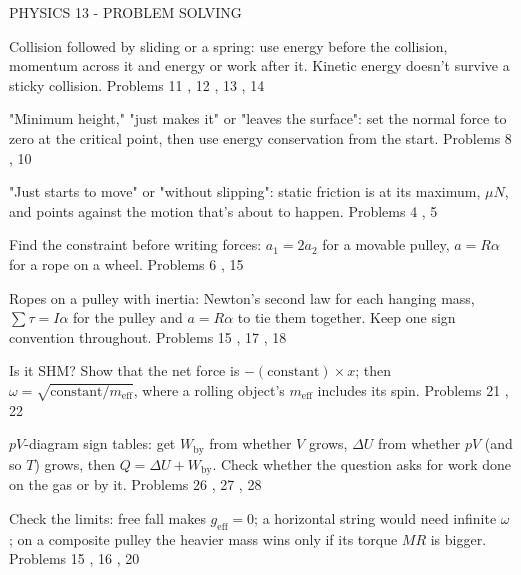 PHYSICS 13 - PROBLEM SOLVING

Collision followed by sliding or a spring: use energy before the collision, momentum across it and energy or work after it. Kinetic energy doesn't survive a sticky collision. Problems 11 , 12 , 13 , 14

"Minimum height," "just makes it" or "leaves the surface": set the normal force to zero at the critical point, then use energy conservation from the start. Problems 8 , 10

"Just starts to move" or "without slipping": static friction is at its maximum, \(\mu N\), and points against the motion that's about to happen. Problems 4 , 5

Find the constraint before writing forces: \(a_1 = 2a_2\) for a movable pulley, \(a = R\alpha\) for a rope on a wheel. Problems 6 , 15

Ropes on a pulley with inertia: Newton's second law for each hanging mass, \(\sum\tau = I\alpha\) for the pulley and \(a = R\alpha\) to tie them together. Keep one sign convention throughout. Problems 15 , 17 , 18

Is it SHM? Show that the net force is \(-(\text{constant})\times x\); then \(\omega = \sqrt{\text{constant}/m_{\text{eff}}}\), where a rolling object's \(m_{\text{eff}}\) includes its spin. Problems 21 , 22

\(pV\)-diagram sign tables: get \(W_{\text{by}}\) from whether \(V\) grows, \(\Delta U\) from whether \(pV\) (and so \(T\)) grows, then \(Q = \Delta U + W_{\text{by}}\). Check whether the question asks for work done on the gas or by it. Problems 26 , 27 , 28

Check the limits: free fall makes \(g_{\text{eff}} = 0\); a horizontal string would need infinite \(\omega\); on a composite pulley the heavier mass wins only if its torque \(MR\) is bigger. Problems 15 , 16 , 20
